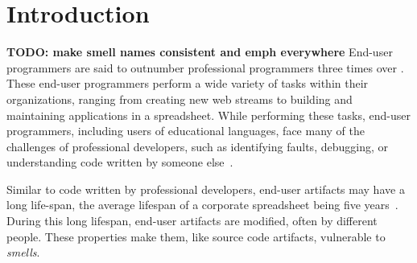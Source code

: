 \documentclass{sig-alternate}
\newcommand{\todo}[1]{\textbf{TODO: #1}}
\newcommand{\ms}{LEGO MINDSTORMS EV3}
\begin{document}
\begin{abstract}
In the workforce today, millions of people program without degrees or professional training in software development. 
These end-user programmers perform a variety of tasks, from combining web information to building models to support business decisions. Software engineering research into code smells has traditionally focused on professionally used object-oriented programming languages, yet these end-user domains and languages also suffer from code smells. 

In this work, we explore recent research in two distinct end-user domains and languages: spreadsheets in Microsoft Excel and web mashups in Yahoo Pipes. Based on existing OO-smells and their applications to these two end-user domains, we distill a catalog of generic end-user smells. 
We demonstrate the broad applicability of the catalog by mapping the smells to two additional end-user languages not previously targeted by smell detection and refactoring research, both aimed at education: \ms~and Microsoft's Kodu. The results of this application show that  OO inspired smells indeed occur in educational end-user languages and are present in 88\% and 93\% of the EV3 and Kodu programs, respectively. Most commonly we find that programs are plagued with lazy class, duplication and dead code smells, with the duplication smells being present in nearly 2/3 of programs in each language. We conclude the paper by proposing new end-user smells inspired by the educational languages, moving beyond the OO paradigm. 
\end{abstract}


\section{Introduction}
\todo{make smell names consistent and emph everywhere}
End-user programmers are said to outnumber  professional programmers three times over \cite{Scaf2005}.
These end-user programmers perform a wide variety of tasks within their organizations, ranging from creating new web streams to building and maintaining applications in a spreadsheet. While performing these tasks, end-user programmers, including users of educational languages,  face many of the challenges of professional developers, such as identifying faults, debugging, or understanding code written by someone else~\cite{Ko2011}. 

Similar to code written by professional developers, end-user artifacts may have a long life-span, the average lifespan of a corporate spreadsheet being five years~\cite{Hermans2011}. During this long lifespan, end-user artifacts are modified, often by different people.
These properties make them, like source code artifacts, vulnerable to \emph{smells}. 
\end{document}
